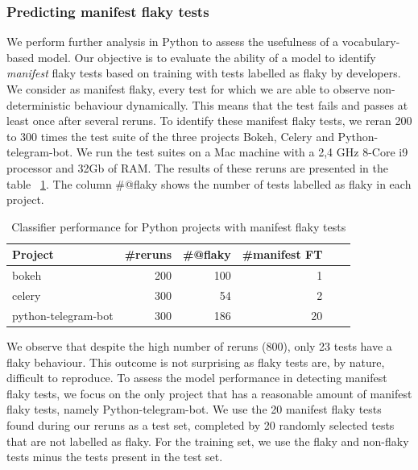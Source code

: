 \subsubsection{Predicting manifest flaky tests}
We perform further analysis in Python to assess the usefulness of a vocabulary-based model. 
Our objective is to evaluate the ability of a model to identify \textit{manifest} flaky tests based on training with tests labelled as flaky by developers. 
We consider as manifest flaky, every test for which we are able to observe non-deterministic behaviour dynamically.
This means that the test fails and passes at least once after several reruns.
To identify these manifest flaky tests, we reran 200 to 300 times the test suite of the three projects Bokeh, Celery and Python-telegram-bot. 
We run the test suites on a Mac machine with a 2,4 GHz 8-Core i9 processor and 32Gb of RAM.
The results of these reruns are presented in the table ~\ref{manifestStudy}.
The column \#@flaky shows the number of tests labelled as flaky in each project.
\begin{table}
\centering
\caption{Classifier performance for Python projects with manifest flaky tests}
\label{manifestStudy}
 \begin{tabular}{l|r r r r r} 
 \toprule
 \textbf{Project} & \textbf{\#reruns} & \textbf{\#@flaky} & \textbf{\#manifest FT}\\ [0.25ex]
 \midrule
 bokeh & 200 & 100 & 1 \\
 celery & 300 & 54 & 2 \\
 python-telegram-bot & 300 & 186 & 20 \\ 
 \bottomrule
\end{tabular}
\end{table}

We observe that despite the high number of reruns (800), only 23 tests have a flaky behaviour. This outcome is not surprising as flaky tests are, by nature, difficult to reproduce. To assess the model performance in detecting manifest flaky tests, we focus on the only project that has a reasonable amount of manifest flaky tests, namely Python-telegram-bot. We use the 20 manifest flaky tests found during our reruns as a test set, completed by 20 randomly selected tests that are not labelled as flaky. For the training set, we use the flaky and non-flaky tests minus the tests present in the test set. 

